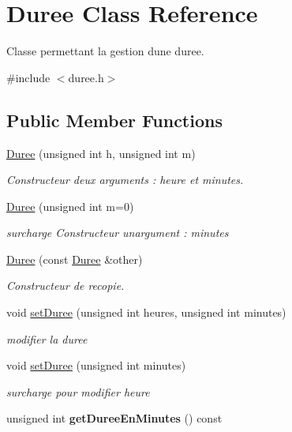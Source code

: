 \hypertarget{class_duree}{}\section{Duree Class Reference}
\label{class_duree}


Classe permettant la gestion d\textquotesingle{}une duree.  




{\ttfamily \#include $<$duree.\+h$>$}

\subsection*{Public Member Functions}
\begin{DoxyCompactItemize}
\item 
\hyperlink{class_duree_a9031ee4cb937a2cb48a833924e0d8175}{Duree} (unsigned int h, unsigned int m)
\begin{DoxyCompactList}\small\item\em Constructeur deux arguments \+: heure et minutes. \end{DoxyCompactList}\item 
\hyperlink{class_duree_a29ce444d85f2870058025ce5db0802a5}{Duree} (unsigned int m=0)
\begin{DoxyCompactList}\small\item\em surcharge Constructeur unargument \+: minutes \end{DoxyCompactList}\item 
\hyperlink{class_duree_a419162e60eca1314a3611752ab3d68cd}{Duree} (const \hyperlink{class_duree}{Duree} \&other)
\begin{DoxyCompactList}\small\item\em Constructeur de recopie. \end{DoxyCompactList}\item 
void \hyperlink{class_duree_a9d38c17651a31e52a19252a891933da4}{set\+Duree} (unsigned int heures, unsigned int minutes)
\begin{DoxyCompactList}\small\item\em modifier la duree \end{DoxyCompactList}\item 
void \hyperlink{class_duree_acf2e742070a8b558ff7c5fab3f2ec472}{set\+Duree} (unsigned int minutes)
\begin{DoxyCompactList}\small\item\em surcharge pour modifier heure \end{DoxyCompactList}\item 
\hypertarget{class_duree_a0e25c3388ea08f41140aee71ffaae4ee}{}unsigned int {\bfseries get\+Duree\+En\+Minutes} () const \label{class_duree_a0e25c3388ea08f41140aee71ffaae4ee}


\end{DoxyCompactItemize}
